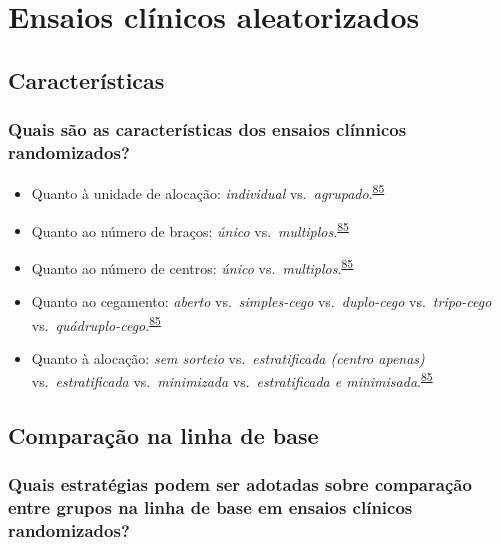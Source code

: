 \documentclass[
]{book}
\begin{document}
\hypertarget{ensaios-cluxednicos-aleatorizados}{%
\chapter{\texorpdfstring{\textbf{Ensaios clínicos aleatorizados}}{Ensaios clínicos aleatorizados}}\label{ensaios-cluxednicos-aleatorizados}}

\hypertarget{caracteristicas}{%
\section{Características}\label{caracteristicas}}

\hypertarget{quais-suxe3o-as-caracteruxedsticas-dos-ensaios-cluxednnicos-randomizados}{%
\subsection{Quais são as características dos ensaios clínnicos randomizados?}\label{quais-suxe3o-as-caracteruxedsticas-dos-ensaios-cluxednnicos-randomizados}}

\begin{itemize}
\item
  Quanto à unidade de alocação: \emph{individual} vs.~\emph{agrupado}.\textsuperscript{\protect\hyperlink{ref-Bruce2022}{85}}
\item
  Quanto ao número de braços: \emph{único} vs.~\emph{multiplos}.\textsuperscript{\protect\hyperlink{ref-Bruce2022}{85}}
\item
  Quanto ao número de centros: \emph{único} vs.~\emph{multiplos}.\textsuperscript{\protect\hyperlink{ref-Bruce2022}{85}}
\item
  Quanto ao cegamento: \emph{aberto} vs.~\emph{simples-cego} vs.~\emph{duplo-cego} vs.~\emph{tripo-cego} vs.~\emph{quádruplo-cego}.\textsuperscript{\protect\hyperlink{ref-Bruce2022}{85}}
\item
  Quanto à alocação: \emph{sem sorteio} vs.~\emph{estratificada (centro apenas)} vs.~\emph{estratificada} vs.~\emph{minimizada} vs.~\emph{estratificada e minimisada}.\textsuperscript{\protect\hyperlink{ref-Bruce2022}{85}}
\end{itemize}

\hypertarget{comparacao-linha-de-base}{%
\section{Comparação na linha de base}\label{comparacao-linha-de-base}}

\hypertarget{quais-estratuxe9gias-podem-ser-adotadas-sobre-comparauxe7uxe3o-entre-grupos-na-linha-de-base-em-ensaios-cluxednicos-randomizados}{%
\subsection{Quais estratégias podem ser adotadas sobre comparação entre grupos na linha de base em ensaios clínicos randomizados?}\label{quais-estratuxe9gias-podem-ser-adotadas-sobre-comparauxe7uxe3o-entre-grupos-na-linha-de-base-em-ensaios-cluxednicos-randomizados}}
\end{document}
